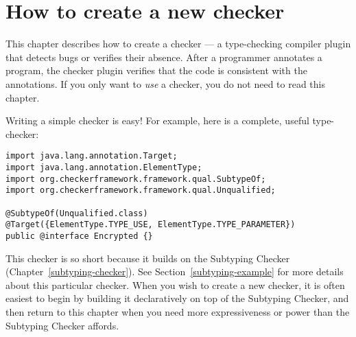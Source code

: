 \htmlhr
\chapter{How to create a new checker\label{creating-a-checker}}
\label{writing-a-checker} %

\newcommand{\TreeAPIBase}{https://docs.oracle.com/javase/8/docs/jdk/api/javac/tree/com/sun/source}
\newcommand{\refTreeclass}[2]{\href{\TreeAPIBase{}/#1/#2.html?is-external=true}{\<#2>}}
\newcommand{\ModelAPIBase}{https://docs.oracle.com/javase/8/docs/api/javax/lang/model}
\newcommand{\refModelclass}[2]{\href{\ModelAPIBase{}/#1/#2.html?is-external=true}{\<#2>}}

This chapter describes how to create a checker
--- a type-checking compiler plugin that detects bugs or verifies their
absence.  After a programmer annotates a program,
the checker plugin verifies that the code is consistent
with the annotations.
If you only want to \emph{use} a checker, you do not need to read this
chapter.


Writing a simple checker is easy!  For example, here is a complete, useful
type-checker:

\begin{Verbatim}
import java.lang.annotation.Target;
import java.lang.annotation.ElementType;
import org.checkerframework.framework.qual.SubtypeOf;
import org.checkerframework.framework.qual.Unqualified;

@SubtypeOf(Unqualified.class)
@Target({ElementType.TYPE_USE, ElementType.TYPE_PARAMETER})
public @interface Encrypted {}
\end{Verbatim}

This checker is so short because it builds on the Subtyping Checker
(Chapter~\ref{subtyping-checker}).
See Section~\ref{subtyping-example} for more details about this particular checker.
When you wish to create a new checker, it is often easiest to begin by
building it declaratively on top of the Subtyping Checker, and then return to
this chapter when you need more expressiveness or power than the Subtyping
Checker affords.

